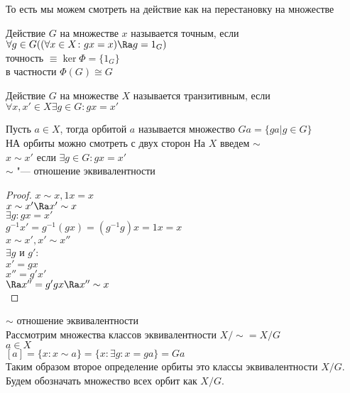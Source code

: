 То есть мы можем смотреть на действие как на перестановку на множестве\\

\begin{Def}
Действие $G$ на множестве $x$ называется точным, если 
$\forall g \in G ((\forall x \in X\colon gx = x) \Ra g = 1_{G})$\\
точность $\equiv \ker \Phi = \{1_G\}$\\
в частности $\Phi(G) \cong G$ \\
\end{Def}

\begin{Def}
Действие $G$ на множестве $X$ называется транзитивным, если 
$\forall x, x' \in X \exists g \in G \colon gx = x'$
\end{Def}
\begin{Def}
Пусть $a \in X$, тогда орбитой $a$ называется
множество $Ga = \{ga| g \in G\}$ \\

НА орбиты можно смотреть с двух сторон
На $X$ введем $\sim$\\
    $x \sim x'$ если $\exists g \in G \colon gx = x'$\\

$\sim$  "--- отношение эквивалентности\\
\end{Def}
\begin{proof}
$x \sim x, 1x = x$\\
$x \sim x' \Ra x' \sim x$\\
$\exists g \colon gx = x'$\\
$g^{-1}x' = g^{-1}(gx) = (g^{-1}g)x = 1x = x$\\

$x \sim x', x' \sim x''$\\
$\exists g$ и $g'$:\\
$x' = gx$\\
$x'' = g'x'$\\
$\Ra x'' = g'gx \Ra x'' \sim x$\\
\end{proof}
$\sim$ отношение эквивалентности\\
Рассмотрим множества классов эквивалентности $X / \sim = X / G$\\
$a \in X$\\
$[a] = \{x \colon x \sim a\} = \{x \colon \exists g \colon x = ga\} = Ga$ \\

Таким образом второе определение орбиты это классы эквивалентности $X/G$.
Будем обозначать множество всех орбит как $X/G$.

